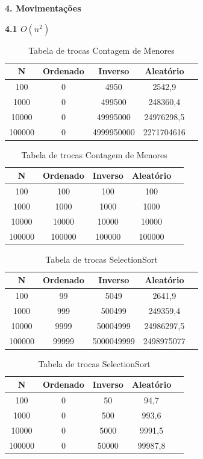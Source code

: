 \documentclass[10pt]{article}
\begin{document}
\vspace{0.25cm}

\textbf{4. Movimentações}

\vspace{0.5cm}

\textbf{4.1 $O(n^2)$}

\begin{table}[H]
  \parbox{.45\linewidth}{
    \centering
    \caption{Tabela de trocas BubbleSort}
    \begin{tabular}{|c|c|c|c|c|}
    \hline
    N & Ordenado & Inverso & Aleatório \\ \hline
    100 & 0 & 4950 & 2542,9 \\ \hline
    1000 & 0 & 499500 & 248360,4 \\ \hline
    10000 & 0 & 49995000 & 24976298,5 \\ \hline
    100000 & 0 & 4999950000 & 2271704616 \\ \hline
    \end{tabular}
  }
  \hfill
  \parbox{.45\linewidth}{
    \centering
    \caption{Tabela de trocas Contagem de Menores}
    \begin{tabular}{|c|c|c|c|c|}
    \hline
    N & Ordenado & Inverso & Aleatório \\ \hline
    100 & 100 & 100 & 100 \\ \hline
    1000 & 1000 & 1000 & 1000 \\ \hline
    10000 & 10000 & 10000 & 10000 \\ \hline
    100000 & 100000 & 100000 & 100000 \\ \hline
    \end{tabular}
  }
\end{table}

\begin{table}[H]
  \parbox{.45\linewidth}{
    \centering
    \caption{Tabela de trocas InsertionSort}
    \begin{tabular}{|c|c|c|c|c|}
    \hline
    N & Ordenado & Inverso & Aleatório \\ \hline
    100 & 99 & 5049 & 2641,9 \\ \hline
    1000 & 999 & 500499 & 249359,4 \\ \hline
    10000 & 9999 & 50004999 & 24986297,5 \\ \hline
    100000 & 99999 & 5000049999 & 2498975077 \\ \hline
    \end{tabular}
  }
  \hfill
  \parbox{.45\linewidth}{
    \centering
    \caption{Tabela de trocas SelectionSort}
    \begin{tabular}{|c|c|c|c|c|}
    \hline
    N & Ordenado & Inverso & Aleatório \\ \hline
    100 & 0 & 50 & 94,7 \\ \hline
    1000 & 0 & 500 & 993,6 \\ \hline
    10000 & 0 & 5000 & 9991,5 \\ \hline
    100000 & 0 & 50000 & 99987,8 \\ \hline
    \end{tabular}
  }
\end{table}
\end{document}
